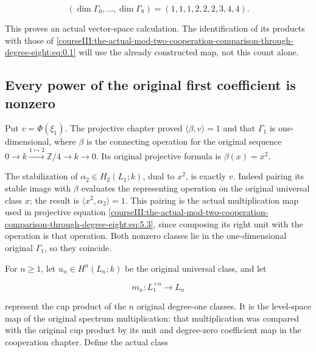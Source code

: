 \begin{equation}
(\dim\Gamma_0,\ldots,\dim\Gamma_8)
 =(1,1,1,2,2,2,3,4,4).
\label{courseIII:the-actual-mod-two-cooperation-comparison-through-degree-eight:eq:5.3}
\end{equation}

This proves an actual vector-space calculation. The identification of its products with those of \eqref{courseIII:the-actual-mod-two-cooperation-comparison-through-degree-eight:eq:0.1} will use the already constructed map, not this count alone.

\subsection{Every power of the original first coefficient is nonzero}
\label{courseIII:the-actual-mod-two-cooperation-comparison-through-degree-eight:actual-eight-nonzero-powers}

\label{courseIII:the-actual-mod-two-cooperation-comparison-through-degree-eight:section-6}\label{courseIII:actual-degree8:6}

Put \(v=\Phi(\xi_1)\). The projective chapter proved
\(\langle\beta,v\rangle=1\) and that \(\Gamma_1\) is one-dimensional, where \(\beta\) is the connecting operation for the original sequence \(0\to k\xrightarrow{1\mapsto2}\mathbb Z/4\to k\to0\). Its original projective formula is \(\beta(x)=x^2\).

The stabilization of \(\alpha_2\in H_2(L_1;k)\), dual to \(x^2\), is exactly \(v\). Indeed pairing its stable image with \(\beta\) evaluates the representing operation on the original universal class \(x\); the result is \(\langle x^2,\alpha_2\rangle=1\). This pairing is the actual multiplication map used in projective equation \eqref{courseIII:the-actual-mod-two-cooperation-comparison-through-degree-eight:eq:5.3}, since composing its right unit with the operation is that operation. Both nonzero classes lie in the one-dimensional original \(\Gamma_1\), so they coincide.

For \(n\geq1\), let \(u_n\in H^n(L_n;k)\) be the original universal class, and let

\begin{equation}
m_n:L_1^{\times n}\longrightarrow L_n
\label{courseIII:the-actual-mod-two-cooperation-comparison-through-degree-eight:eq:6.1}
\end{equation}

represent the cup product of the \(n\) original degree-one classes. It is the level-space map of the original spectrum multiplication: that multiplication was compared with the original cup product by its unit and degree-zero coefficient map in the cooperation chapter. Define the actual class

